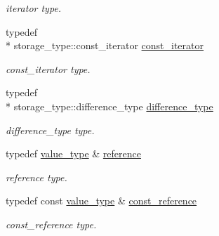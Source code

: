 \begin{DoxyCompactItemize}
\begin{DoxyCompactList}\small\item\em iterator type. \end{DoxyCompactList}\item 
\hypertarget{class_d_o_1_1_sparse_multi_array_a136285f5e1620856973c0c4007453a57}{typedef \\*
storage\-\_\-type\-::const\-\_\-iterator \hyperlink{class_d_o_1_1_sparse_multi_array_a136285f5e1620856973c0c4007453a57}{const\-\_\-iterator}}\label{class_d_o_1_1_sparse_multi_array_a136285f5e1620856973c0c4007453a57}

\begin{DoxyCompactList}\small\item\em const\-\_\-iterator type. \end{DoxyCompactList}\item 
\hypertarget{class_d_o_1_1_sparse_multi_array_a8d8689998714f4431b104a5b21f43e9f}{typedef \\*
storage\-\_\-type\-::difference\-\_\-type \hyperlink{class_d_o_1_1_sparse_multi_array_a8d8689998714f4431b104a5b21f43e9f}{difference\-\_\-type}}\label{class_d_o_1_1_sparse_multi_array_a8d8689998714f4431b104a5b21f43e9f}

\begin{DoxyCompactList}\small\item\em difference\-\_\-type type. \end{DoxyCompactList}\item 
\hypertarget{class_d_o_1_1_sparse_multi_array_abe8933d436779a43cb5c1896ff5f2918}{typedef \hyperlink{class_d_o_1_1_sparse_multi_array_a265a253612b46abed17c61b0a5e5ce30}{value\-\_\-type} \& \hyperlink{class_d_o_1_1_sparse_multi_array_abe8933d436779a43cb5c1896ff5f2918}{reference}}\label{class_d_o_1_1_sparse_multi_array_abe8933d436779a43cb5c1896ff5f2918}

\begin{DoxyCompactList}\small\item\em reference type. \end{DoxyCompactList}\item 
\hypertarget{class_d_o_1_1_sparse_multi_array_afdb67657e63a66ed3fae7b0c9fd81b48}{typedef const \hyperlink{class_d_o_1_1_sparse_multi_array_a265a253612b46abed17c61b0a5e5ce30}{value\-\_\-type} \& \hyperlink{class_d_o_1_1_sparse_multi_array_afdb67657e63a66ed3fae7b0c9fd81b48}{const\-\_\-reference}}\label{class_d_o_1_1_sparse_multi_array_afdb67657e63a66ed3fae7b0c9fd81b48}

\begin{DoxyCompactList}\small\item\em const\-\_\-reference type. \end{DoxyCompactList}\end{DoxyCompactItemize}
